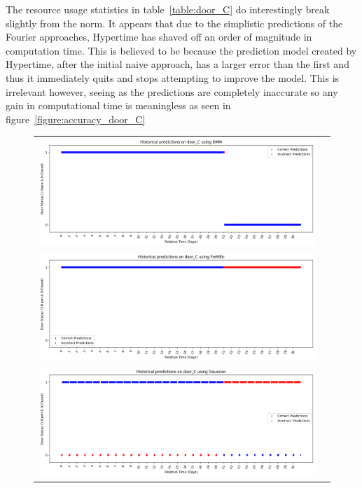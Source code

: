 The resource usage statistics in table~\ref{table:door_C} do interestingly break slightly
from the norm. It appears that due to the simplistic predictions of the
Fourier approaches, Hypertime has shaved off an order of magnitude in
computation time. This is believed to be because the prediction model created
by Hypertime, after the initial naive approach, has a larger error than the first and thus it immediately quits
and stops attempting to improve the model. This is irrelevant however, seeing
as the predictions are completely inaccurate so any gain in computational time
is meaningless as seen in figure~\ref{figure:accuracy_door_C}\\

\begin{center}
\begin{figure}[!Hp]
  \begin{tabular}{cc}
    {\includegraphics[width = 6in]{images/results/Historical_door_C_DMM.png}} \\
    {\includegraphics[width = 6in]{images/results/Historical_door_C_FreMEn.png}} \\
    {\includegraphics[width = 6in]{images/results/Historical_door_C_Gaussian.png}} \\

\end{tabular}
\end{figure}
\end{center}
